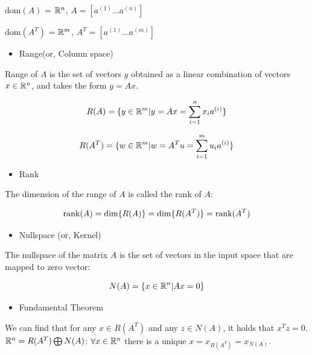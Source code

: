 $\text{dom}(A)$ = $\mathbb{R}^n$, $A = [a^{(1)}...a^{(n)}]$

$\text{dom}(A^T)$ = $\mathbb{R}^m$, $A^T = [a^{(1)}...a^{(m)}]$


\begin{itemize}
	\item Range(or, Column space)
\end{itemize}

Range of $A$ is the set of vectors $y$ obtained as a linear combination of vectors $x\in \mathbb{R}^n$, and takes the form $y= Ax$.

\begin{equation*}
R(A) = \{y\in \mathbb{R}^m | y = Ax = \sum^n_{i=1}x_ia^{(i)}\}
\end{equation*}

\begin{equation*}
R(A^T) = \{w\in \mathbb{R}^m | w = A^Tu = \sum^m_{i=1}u_ia^{(i)}\}
\end{equation*}

\begin{itemize}
	\item Rank
\end{itemize}

The dimension of the range of $A$ is called the rank of $A$:

\begin{equation*}
\operatorname{rank}(A) = \text{dim}\{R(A)\} = \text{dim}\{R(A^T)\} =\operatorname{rank}(A^T)
\end{equation*}

\begin{itemize}
	\item Nullspace (or, Kernel)
\end{itemize}

The nullspace of the matrix $A$ is the set of vectors in the input space that are mapped to zero vector:

\begin{equation*}
N(A) = \{x\in \mathbb{R}^n | Ax = 0\}
\end{equation*}

\begin{itemize}
	\item Fundamental Theorem
\end{itemize}

We can find that for any $x\in R(A^T)$ and any $z\in N(A)$, it holds that $x^Tz = 0$.\\

$\mathbb{R}^n = R(A^T) \bigoplus N(A)$: $\forall x\in \mathbb{R}^n$ there is a unique $x = x_{R(A^T)} = x_{N(A)}$.\\

